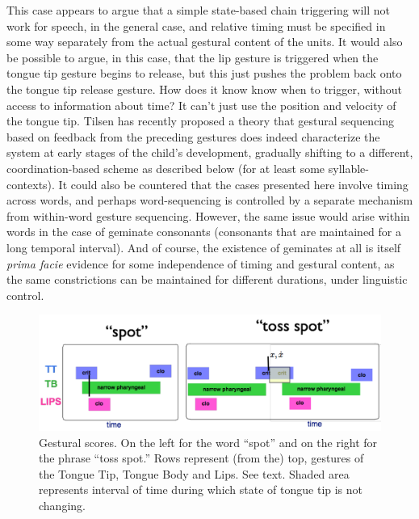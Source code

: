 \documentclass[output=paper,
modfonts
]{LSP/langsci}
\begin{document}
This case appears to argue that a simple state-based chain triggering will not work for speech, in the general case, and relative timing must be specified in some way separately from the actual gestural content of the units. It would also be possible to argue, in this case, that the lip gesture is triggered when the tongue tip gesture begins to release, but this just pushes the problem back onto the tongue tip release gesture. How does it know know when to trigger, without access to information about time? It can't just use the position and velocity of the tongue tip.  Tilsen \citeyearpar{Tilsen2016} has recently proposed a theory that gestural sequencing based on feedback from the preceding gestures does indeed characterize the system at early stages of the child's development, gradually shifting to a different, coordination-based scheme as described below (for at least some syllable-contexts).   It could also be countered that the cases presented here involve timing across words, and perhaps word-sequencing is controlled by a separate mechanism from within-word gesture sequencing. However, the same issue would arise within words in the case of geminate consonants (consonants that are maintained for a long temporal interval). And of course, the existence of geminates at all is itself  \textit{prima facie} evidence  for some independence of timing and gestural content, as the same constrictions can be maintained for different durations, under linguistic control.   

\begin{figure}[htpb]
\includegraphics [width=\linewidth]{toss_spot}
\caption{Gestural scores. On the left for the word ``spot'' and on the right for the phrase ``toss spot.'' Rows represent (from the) top, gestures of the Tongue Tip, Tongue Body and Lips. See text. Shaded area represents interval of time during which state of tongue tip is not changing.}
\label{fig:spot}
\end{figure} 
\end{document}
